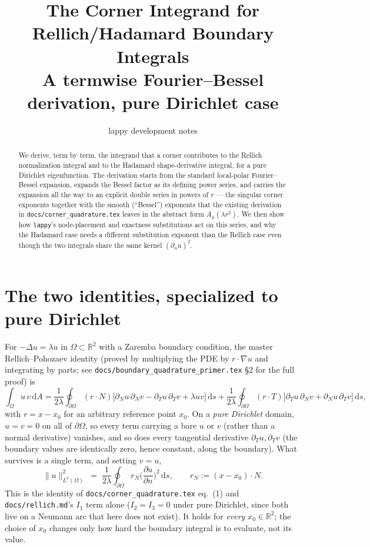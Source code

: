 \documentclass[11pt]{article}
\title{The Corner Integrand for Rellich/Hadamard Boundary Integrals\\
\large A termwise Fourier--Bessel derivation, pure Dirichlet case}
\author{lappy development notes}
\date{}
\theoremstyle{remark}
\newcommand{\dd}{\,\mathrm{d}}
\newcommand{\Om}{\Omega}
\newcommand{\pdn}[1]{\frac{\partial #1}{\partial n}}
\newcommand{\R}{\mathbb{R}}
\newcommand{\code}[1]{\texttt{#1}}
\begin{document}
\maketitle

\begin{abstract}
\noindent
We derive, term by term, the integrand that a corner contributes to the Rellich normalization
integral and to the Hadamard shape-derivative integral, for a pure Dirichlet eigenfunction. The
derivation starts from the standard local-polar Fourier--Bessel expansion, expands the Bessel
factor as its defining power series, and carries the expansion all the way to an explicit double
series in powers of $r$ --- the singular corner exponents together with the smooth (``Bessel'')
exponents that the existing derivation in \code{docs/corner\_quadrature.tex} leaves in the
abstract form $A_\mu(\lambda r^2)$. We then show how \code{lappy}'s node-placement and
exactness substitutions act on this series, and why the Hadamard case needs a different
substitution exponent than the Rellich case even though the two integrals share the same
kernel $(\partial_n u)^2$.
\end{abstract}

\tableofcontents

\section{The two identities, specialized to pure Dirichlet}\label{sec:setup}

For $-\Delta u = \lambda u$ in $\Om\subset\R^2$ with a Zaremba boundary condition, the master
Rellich--Pohozaev identity (proved by multiplying the PDE by $r\cdot\nabla u$ and integrating by
parts; see \code{docs/boundary\_quadrature\_primer.tex} \S2 for the full proof) is
\[
  \int_\Om u\,v \dd A = \frac{1}{2\lambda}\oint_{\partial\Om}(r\cdot N)
  \Big[\partial_N u\,\partial_N v - \partial_T u\,\partial_T v + \lambda u v\Big]\dd s
  + \frac{1}{2\lambda}\oint_{\partial\Om}(r\cdot T)\Big[\partial_T u\,\partial_N v + \partial_N u\,\partial_T v\Big]\dd s,
\]
with $r = x-x_0$ for an arbitrary reference point $x_0$. On a \emph{pure Dirichlet} domain,
$u=v=0$ on all of $\partial\Om$, so every term carrying a bare $u$ or $v$ (rather than a normal
derivative) vanishes, and so does every tangential derivative $\partial_T u,\partial_T v$ (the
boundary values are identically zero, hence constant, along the boundary). What survives is a
single term, and setting $v=u$,
\begin{equation}\label{eq:rellich}
  \|u\|^2_{L^2(\Om)} \;=\; \frac{1}{2\lambda}\oint_{\partial\Om} r_N \Big(\pdn{u}\Big)^{\!2}\dd s,
  \qquad r_N := (x-x_0)\cdot N.
\end{equation}
This is the identity of \code{docs/corner\_quadrature.tex} eq.~(1) and \code{docs/rellich.md}'s
$I_1$ term alone ($I_2=I_3=0$ under pure Dirichlet, since both live on a Neumann arc that here
does not exist). It holds for \emph{every} $x_0\in\R^2$; the choice of $x_0$ changes only how
hard the boundary integral is to evaluate, not its value.
\end{document}
